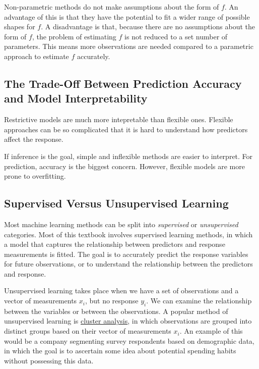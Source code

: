 \documentclass[]{book}
\begin{document}
Non-parametric methods do not make assumptions about the form of \(f\). An advantage of this is that they have the potential to fit a wider range of possible shapes for \(f\). A disadvantage is that, because there are no assumptions about the form of \(f\), the problem of estimating \(f\) is not reduced to a set number of parameters. This means more observations are needed compared to a parametric approach to estimate \(f\) accurately.

\hypertarget{the-trade-off-between-prediction-accuracy-and-model-interpretability}{%
\subsection{The Trade-Off Between Prediction Accuracy and Model Interpretability}\label{the-trade-off-between-prediction-accuracy-and-model-interpretability}}

Restrictive models are much more intepretable than flexible ones. Flexible approaches can be so complicated that it is hard to understand how predictors affect the response.

If inference is the goal, simple and inflexible methods are easier to interpret. For prediction, accuracy is the biggest concern. However, flexible models are more prone to overfitting.

\hypertarget{supervised-versus-unsupervised-learning}{%
\subsection{Supervised Versus Unsupervised Learning}\label{supervised-versus-unsupervised-learning}}

Most machine learning methods can be split into \emph{supervised} or \emph{unsupervised} categories. Most of this textbook involves supervised learning methods, in which a model that captures the relationship between predictors and response measurements is fitted. The goal is to accurately predict the response variables for future observations, or to understand the relationship between the predictors and response.

Unsupervised learning takes place when we have a set of observations and a vector of measurements \(x_i\), but no response \(y_i\). We can examine the relationship between the variables or between the observations. A popular method of unsupervised learning is \href{https://en.wikipedia.org/wiki/Cluster_analysis}{cluster analysis}, in which observations are grouped into distinct groups based on their vector of measurements \(x_i\). An example of this would be a company segmenting survey respondents based on demographic data, in which the goal is to ascertain some idea about potential spending habits without possessing this data.
\end{document}
